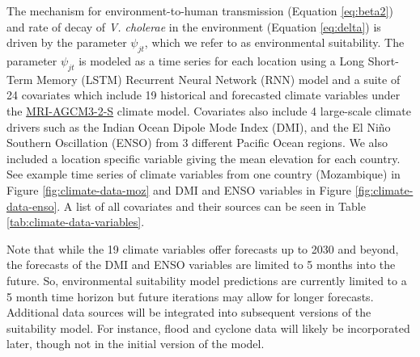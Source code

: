 \documentclass[
]{book}
\begin{document}
The mechanism for environment-to-human transmission (Equation \eqref{eq:beta2}) and rate of decay of \emph{V. cholerae} in the environment (Equation \eqref{eq:delta}) is driven by the parameter \(\psi_{jt}\), which we refer to as environmental suitability. The parameter \(\psi_{jt}\) is modeled as a time series for each location using a Long Short-Term Memory (LSTM) Recurrent Neural Network (RNN) model and a suite of 24 covariates which include 19 historical and forecasted climate variables under the \href{https://www.wdc-climate.de/ui/cmip6?input=CMIP6.HighResMIP.MRI.MRI-AGCM3-2-S.highresSST-present}{MRI-AGCM3-2-S} climate model. Covariates also include 4 large-scale climate drivers such as the Indian Ocean Dipole Mode Index (DMI), and the El Niño Southern Oscillation (ENSO) from 3 different Pacific Ocean regions. We also included a location specific variable giving the mean elevation for each country. See example time series of climate variables from one country (Mozambique) in Figure \ref{fig:climate-data-moz} and DMI and ENSO variables in Figure \ref{fig:climate-data-enso}. A list of all covariates and their sources can be seen in Table \ref{tab:climate-data-variables}.

Note that while the 19 climate variables offer forecasts up to 2030 and beyond, the forecasts of the DMI and ENSO variables are limited to 5 months into the future. So, environmental suitability model predictions are currently limited to a 5 month time horizon but future iterations may allow for longer forecasts. Additional data sources will be integrated into subsequent versions of the suitability model. For instance, flood and cyclone data will likely be incorporated later, though not in the initial version of the model.
\end{document}
